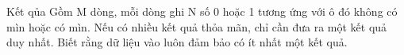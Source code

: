 Kết qủa
Gồm M dòng, mỗi dòng ghi N số 0 hoặc 1 tương ứng với ô đó không có mìn hoặc có mìn. Nếu có nhiều kết quả thỏa mãn, chỉ cần đưa ra một kết   quả duy nhất. Biết rằng dữ liệu vào luôn đảm bảo có ít nhất một kết quả.